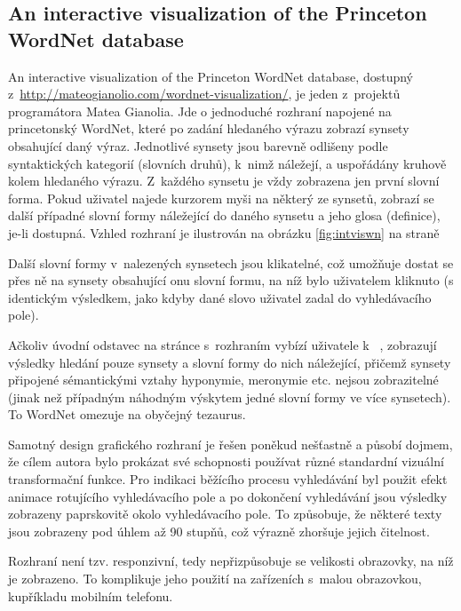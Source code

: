 \documentclass[a4paper, 11pt, oneside, showtrims]{book}
\begin{document}
				\subsection{An interactive visualization of the Princeton WordNet database}
				\label{wnvis:intviswn}

					An interactive visualization of the Princeton WordNet database, dostupný z~\url{http://mateogianolio.com/wordnet-visualization/}, je jeden z~projektů programátora Matea Gianolia. Jde o jednoduché rozhraní napojené na princetonský WordNet, které po zadání hledaného výrazu zobrazí synsety obsahující daný výraz. Jednotlivé synsety jsou barevně odlišeny podle syntaktických kategorií (slovních druhů), k~nimž náležejí, a uspořádány kruhově kolem hledaného výrazu. Z~každého synsetu je vždy zobrazena jen první slovní forma. Pokud uživatel najede kurzorem myši na některý ze synsetů, zobrazí se další případné slovní formy náležející do daného synsetu a jeho glosa (definice), je-li dostupná. Vzhled rozhraní je ilustrován na obrázku \ref{fig:intviswn} na straně \pageref{fig:intviswn}

					Další slovní formy v~nalezených synsetech jsou klikatelné, což umožňuje dostat se přes ně na synsety obsahující onu slovní formu, na níž bylo uživatelem kliknuto (s identickým výsledkem, jako kdyby dané slovo uživatel zadal do vyhledávacího pole).

					Ačkoliv úvodní odstavec na stránce s~rozhraním vybízí uživatele k~ \parencite{GianolioWN}, zobrazují výsledky hledání pouze synsety a slovní formy do nich náležející, přičemž synsety připojené sémantickými vztahy hyponymie, meronymie etc. nejsou zobrazitelné (jinak než případným náhodným výskytem jedné slovní formy ve více synsetech). To WordNet omezuje na obyčejný tezaurus.

					Samotný design grafického rozhraní je řešen poněkud nešťastně a působí dojmem, že cílem autora bylo prokázat své schopnosti používat různé standardní vizuální transformační funkce. Pro indikaci běžícího procesu vyhledávání byl použit efekt animace rotujícího vyhledávacího pole a po dokončení vyhledávání jsou výsledky zobrazeny paprskovitě okolo vyhledávacího pole. To způsobuje, že některé texty jsou zobrazeny pod úhlem až 90 stupňů, což výrazně zhoršuje jejich čitelnost.  %

					Rozhraní není tzv. responzivní, tedy nepřizpůsobuje se velikosti obrazovky, na níž je zobrazeno. To komplikuje jeho použití na zařízeních s~malou obrazovkou, kupříkladu mobilním telefonu.
\end{document}
